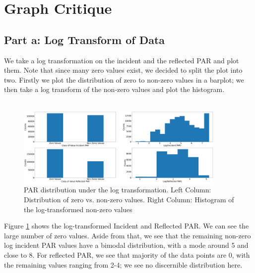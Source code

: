 \documentclass[11pt, letterpaper]{article}
\begin{document}
\section{Graph Critique}
\subsection{Part a: Log Transform of Data}
We take a log transformation on the incident and the reflected PAR and plot them. Note that since many zero values exist, we decided to split the plot into two. Firstly we plot the distribution of zero to non-zero values in a barplot; we then take a log transform of the non-zero values and plot the histogram.
\\ \\
\begin{figure}[h!]
\centering
\captionsetup{justification=centering}
\includegraphics[width=0.9\textwidth]{Report Images/graph_critique_a_v2.png}
\caption{PAR distribution under the log transformation. Left Column: Distribution of zero vs. non-zero values. Right Column: Histogram of the log-transformed non-zero values}
\label{fig:graph_crtique_a}
\end{figure}
Figure \ref{fig:graph_crtique_a} shows the log-transformed Incident and Reflected PAR. We can see the large number of zero values. Aside from that, we see that the remaining non-zero log incident PAR values have a bimodal distribution, with a mode around 5 and close to 8. For reflected PAR, we see that majority of the data points are 0, with the remaining values ranging from 2-4; we see no discernible distribution here.
\end{document}
